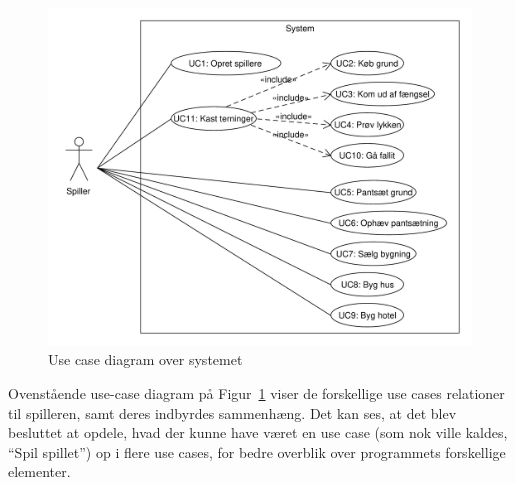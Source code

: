 \documentclass[class=article, crop=false]{standalone}
\begin{document}
    \begin{figure}[H]
        \centering

        \includegraphics[scale=0.7]{diagrams/use_case_diagram.pdf}
        \caption{Use case diagram over systemet}\label{fig:use_case_model}
    \end{figure}

    Ovenstående use-case diagram på Figur~\ref{fig:use_case_model} viser de forskellige use cases relationer til spilleren, samt deres indbyrdes sammenhæng. Det kan ses, at det blev besluttet at opdele, hvad der kunne have været en use case (som nok ville kaldes, “Spil spillet”) op i flere use cases, for bedre overblik over programmets forskellige elementer.
\end{document}
